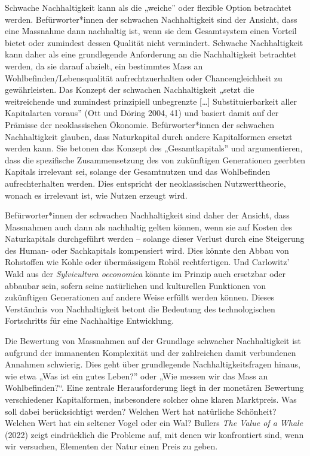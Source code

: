 \documentclass[
  nswissgerman,
  a4paper,
  DIV=11,
  numbers=noendperiod,
  oneside,
  openany]{scrreprt}
\begin{document}
Schwache Nachhaltigkeit kann als die „weiche'' oder flexible Option
betrachtet werden. Befürworter*innen der schwachen Nachhaltigkeit sind
der Ansicht, dass eine Massnahme dann nachhaltig ist, wenn sie dem
Gesamtsystem einen Vorteil bietet oder zumindest dessen Qualität nicht
vermindert. Schwache Nachhaltigkeit kann daher als eine grundlegende
Anforderung an die Nachhaltigkeit betrachtet werden, da sie darauf
abzielt, ein bestimmtes Mass an Wohlbefinden/Lebensqualität
aufrechtzuerhalten oder Chancengleichheit zu gewährleisten. Das Konzept
der schwachen Nachhaltigkeit „setzt die weitreichende und zumindest
prinzipiell unbegrenzte {[}\ldots{]} Substituierbarkeit aller
Kapitalarten voraus'' (Ott und Döring 2004, 41) und basiert damit auf
der Prämisse der neoklassischen Ökonomie. Befürworter*innen der
schwachen Nachhaltigkeit glauben, dass Naturkapital durch andere
Kapitalformen ersetzt werden kann. Sie betonen das Konzept des
„Gesamtkapitals'' und argumentieren, dass die spezifische
Zusammensetzung des von zukünftigen Generationen geerbten Kapitals
irrelevant sei, solange der Gesamtnutzen und das Wohlbefinden
aufrechterhalten werden. Dies entspricht der neoklassischen
Nutzwerttheorie, wonach es irrelevant ist, wie Nutzen erzeugt wird.

Befürworter*innen der schwachen Nachhaltigkeit sind daher der Ansicht,
dass Massnahmen auch dann als nachhaltig gelten können, wenn sie auf
Kosten des Naturkapitals durchgeführt werden -- solange dieser Verlust
durch eine Steigerung des Human- oder Sachkapitals kompensiert wird.
Dies könnte den Abbau von Rohstoffen wie Kohle oder übermässigem Rohöl
rechtfertigen. Und Carlowitz' Wald aus der \emph{Sylvicultura
oeconomica} könnte im Prinzip auch ersetzbar oder abbaubar sein, sofern
seine natürlichen und kulturellen Funktionen von zukünftigen
Generationen auf andere Weise erfüllt werden können. Dieses Verständnis
von Nachhaltigkeit betont die Bedeutung des technologischen Fortschritts
für eine Nachhaltige Entwicklung.

Die Bewertung von Massnahmen auf der Grundlage schwacher Nachhaltigkeit
ist aufgrund der immanenten Komplexität und der zahlreichen damit
verbundenen Annahmen schwierig. Dies geht über grundlegende
Nachhaltigkeitsfragen hinaus, wie etwa „Was ist ein gutes Leben?'' oder
„Wie messen wir das Mass an Wohlbefinden?{\kern0pt}``. Eine zentrale
Herausforderung liegt in der monetären Bewertung verschiedener
Kapitalformen, insbesondere solcher ohne klaren Marktpreis. Was soll
dabei berücksichtigt werden? Welchen Wert hat natürliche Schönheit?
Welchen Wert hat ein seltener Vogel oder ein Wal? Bullers \emph{The
Value of a Whale} (2022) zeigt eindrücklich die Probleme auf, mit denen
wir konfrontiert sind, wenn wir versuchen, Elementen der Natur einen
Preis zu geben.
\end{document}
